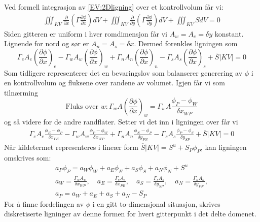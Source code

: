Ved formell integrasjon av \eqref{EV:2Dligning} over et kontrollvolum får vi:
\begin{align}
\iiint_{KV} \frac{\partial}{\partial x} \left( \Gamma \frac{\partial \phi}{\partial x} \right) dV + \iiint_{KV} \frac{\partial}{\partial y} \left( \Gamma \frac{\partial \phi}{\partial y} \right) dV + \iiint_{KV} S dV = 0
\end{align}
Siden gitteren er uniform i hver romdimensjon får vi $A_w = A_e = \delta y$ konstant. Lignende for nord og sør er $A_n = A_s = \delta x$. Dermed forenkles ligningen som
\[
\Gamma_e  A_e\left(\frac{\partial \phi}{\partial x}\right)_e - \Gamma_w A_w \left(\frac{\partial \phi}{\partial x}\right)_w  + \Gamma_n A_n\left(\frac{\partial \phi}{\partial x}\right)_n - \Gamma_s  A_s\left(\frac{\partial \phi}{\partial x}\right)_s  + \overline{S} |KV| = 0
\]
Som tidligere representerer det en bevaringslov som balanserer generering av $\phi $ i en kontrollvolum og fluksene over randene av volumet. Igjen får vi som tilnærming
\[\text{Fluks over }w: \Gamma_w A \left(\frac{\partial \phi}{\partial x}\right)_w =\Gamma_w A\frac{\phi_P-\phi_W}{\delta x_{WP}}\]
og så videre for de andre randflater. Setter vi det inn i ligningen over får vi
\begin{align}
\Gamma_e A_e \frac{\phi_E - \phi_P}{\delta x_{PE}} - \Gamma_w A_w \frac{\phi_P - \phi_W}{\delta x_{WP}} + \Gamma_n A_n \frac{\phi_N - \phi_P}{\delta y_{PN}} - \Gamma_s A_s \frac{\phi_P - \phi_S}{\delta y_{SP}} + \overline{S} |KV| = 0
\end{align}
Når kildetermet representeres i lineær form $\overline{S} |KV| = S^u + S_P \phi_P$, kan ligningen omskrives som:
\begin{align*}
a_P \phi_P = a_W \phi_W + a_E \phi_E + a_S \phi_S + a_N \phi_N + S^u\\
a_W = \frac{\Gamma_w A_w}{\delta x_{WP}}, \quad
a_E = \frac{\Gamma_e A_e}{\delta x_{PE}}, \quad
a_S = \frac{\Gamma_s A_s}{\delta y_{SP}}, \quad
a_N = \frac{\Gamma_n A_n}{\delta y_{PN}}, \\
a_P = a_W + a_E + a_S + a_N - S_P
\end{align*}
For å finne fordelingen av $\phi$ i en gitt to-dimensjonal situasjon, skrives diskretiserte ligninger av denne formen for hvert gitterpunkt i det delte domenet.

